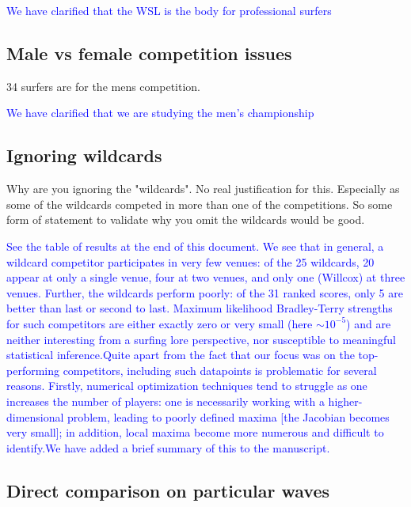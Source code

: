 \documentclass[12pt]{article}
\begin{document}
\textcolor{blue}{We have clarified that the WSL is the body for professional surfers}



\subsection*{Male vs female competition issues}

34 surfers are for the mens competition.

\textcolor{blue}{We have clarified that we are studying the men's
  championship}



\subsection*{Ignoring wildcards}

Why are you ignoring the "wildcards". No real justification for
this. Especially as some of the wildcards competed in more than one of
the competitions. So some form of statement to validate why you omit
the wildcards would be good.

\textcolor{blue}{See the table of results at the end of this document.
  We see that in general, a wildcard competitor participates in very
  few venues: of the 25 wildcards, 20 appear at only a single venue,
  four at two venues, and only one (Willcox) at three venues.
  Further, the wildcards perform poorly: of the 31 ranked scores, only
  5 are better than last or second to last.  Maximum likelihood
  Bradley-Terry strengths for such competitors are either exactly zero
  or very small (here $\sim 10^{-5}$) and are neither interesting from
  a surfing lore perspective, nor susceptible to meaningful
  statistical inference.\newline Quite apart from the fact that our
  focus was on the top-performing competitors, including such
  datapoints is problematic for several reasons.  Firstly, numerical
  optimization techniques tend to struggle as one increases the number
  of players: one is necessarily working with a higher-dimensional
  problem, leading to poorly defined maxima [the Jacobian becomes very
    small]; in addition, local maxima become more numerous and
  difficult to identify.\newline We have added a brief summary of this
  to the manuscript.}

\subsection*{Direct comparison on particular waves}
\end{document}
